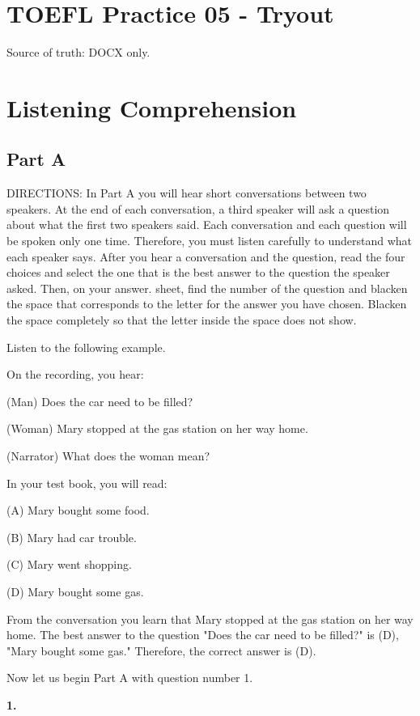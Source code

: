 \documentclass[12pt]{article}
\begin{document}
\section*{TOEFL Practice 05 - Tryout}
Source of truth: DOCX only.
\section*{Listening Comprehension}
\subsection*{Part A}
DIRECTIONS: In Part A you will hear short conversations between two speakers. At the end of each conversation, a third speaker will ask a question about what the first two speakers said. Each conversation and each question will be spoken only one time. Therefore, you must listen carefully to understand what each speaker says. After you hear a conversation and the question, read the four choices and select the one that is the best answer to the question the speaker asked. Then, on your answer. sheet, find the number of the question and blacken the space that corresponds to the letter for the answer you have chosen. Blacken the space completely so that the letter inside the space does not show.\par
\begin{exampleblock}
Listen to the following example.\par
On the recording, you hear:\par
(Man) Does the car need to be filled?\par
(Woman) Mary stopped at the gas station on her way home.\par
(Narrator) What does the woman mean?\par
In your test book, you will read:\par
(A) Mary bought some food.\par
(B) Mary had car trouble.\par
(C) Mary went shopping.\par
(D) Mary bought some gas.\par
From the conversation you learn that Mary stopped at the gas station on her way home. The best answer to the question "Does the car need to be filled?" is (D), "Mary bought some gas." Therefore, the correct answer is (D).\par
Now let us begin Part A with question number 1.\par
\end{exampleblock}
\noindent\textbf{1.}
\end{document}
